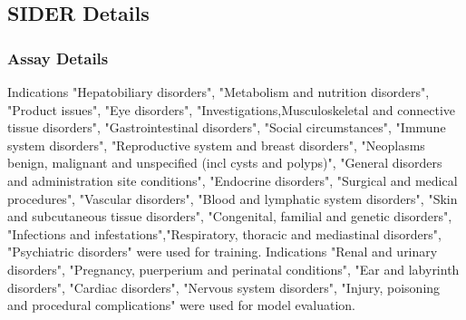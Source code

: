 \documentclass[journal=jacsat,manuscript=article]{achemso}
\begin{document}
\subsection{SIDER Details}
\subsubsection{Assay Details}
Indications "Hepatobiliary disorders", "Metabolism and nutrition disorders", "Product issues", "Eye disorders", "Investigations,Musculoskeletal and connective tissue disorders", "Gastrointestinal disorders", "Social circumstances", "Immune system disorders", "Reproductive system and breast disorders", "Neoplasms benign, malignant and unspecified (incl cysts and polyps)", "General disorders and administration site conditions", "Endocrine disorders", "Surgical and medical procedures", "Vascular disorders", "Blood and lymphatic system disorders", "Skin and subcutaneous tissue disorders", "Congenital, familial and genetic disorders", "Infections and infestations","Respiratory, thoracic and mediastinal disorders", "Psychiatric disorders" were used for training. Indications "Renal and urinary disorders", "Pregnancy, puerperium and perinatal conditions", "Ear and labyrinth disorders", "Cardiac disorders", "Nervous system disorders", "Injury, poisoning and procedural complications" were used for model evaluation.
\end{document}
